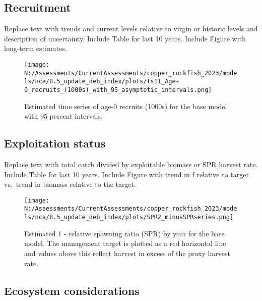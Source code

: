 \documentclass[11pt,
  english,
  letterpaper,
]{article}
\begin{document}
\hypertarget{recruitment}{%
\subsection*{Recruitment}\label{recruitment}}

Replace text with trends and current levels relative to virgin or historic levels and description of uncertainty. Include Table for last 10 years. Include Figure with long-term estimates.



\begin{figure}
\centering
\texttt{[image: N:/Assessments/CurrentAssessments/copper\_rockfish\_2023/models/nca/8.5\_update\_deb\_index/plots/ts11\_Age-0\_recruits\_(1000s)\_with\_95\_asymptotic\_intervals.png]}
\caption{Estimated time series of age-0 recruits (1000s) for the base model with 95 percent intervals.\label{fig:es-recruits}}
\end{figure}

\clearpage

\hypertarget{exploitation-status}{%
\subsection*{Exploitation status}\label{exploitation-status}}

Replace text with total catch divided by exploitable biomass or SPR harvest rate. Include Table for last 10 years. Include Figure with trend in f relative to target vs.~trend in biomass relative to the target.



\begin{figure}
\centering
\texttt{[image: N:/Assessments/CurrentAssessments/copper\_rockfish\_2023/models/nca/8.5\_update\_deb\_index/plots/SPR2\_minusSPRseries.png]}
\caption{Estimated 1 - relative spawning ratio (SPR) by year for the base model. The management target is plotted as a red horizontal line and values above this reflect harvest in excess of the proxy harvest rate.\label{fig:es-1-spr}}
\end{figure}

\hypertarget{ecosystem-considerations}{%
\subsection*{Ecosystem considerations}\label{ecosystem-considerations}}
\end{document}
